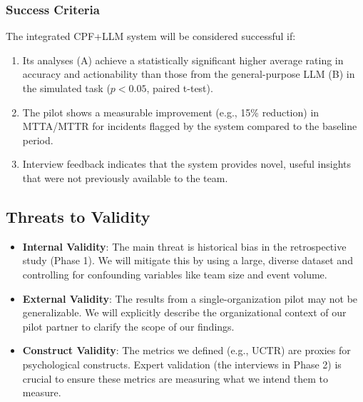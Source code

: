 \documentclass[11pt, a4paper]{article}
\begin{document}
\subsubsection{Success Criteria}
The integrated CPF+LLM system will be considered successful if:
\begin{enumerate}
    \item Its analyses (A) achieve a statistically significant higher average rating in accuracy and actionability than those from the general-purpose LLM (B) in the simulated task ($p < 0.05$, paired t-test).
    \item The pilot shows a measurable improvement (e.g., 15\% reduction) in MTTA/MTTR for incidents flagged by the system compared to the baseline period.
    \item Interview feedback indicates that the system provides novel, useful insights that were not previously available to the team.
\end{enumerate}

\subsection{Threats to Validity}
\label{subsec:threats}
\begin{itemize}
    \item \textbf{Internal Validity}: The main threat is historical bias in the retrospective study (Phase 1). We will mitigate this by using a large, diverse dataset and controlling for confounding variables like team size and event volume.
    \item \textbf{External Validity}: The results from a single-organization pilot may not be generalizable. We will explicitly describe the organizational context of our pilot partner to clarify the scope of our findings.
    \item \textbf{Construct Validity}: The metrics we defined (e.g., UCTR) are proxies for psychological constructs. Expert validation (the interviews in Phase 2) is crucial to ensure these metrics are measuring what we intend them to measure.
\end{itemize}
\end{document}
